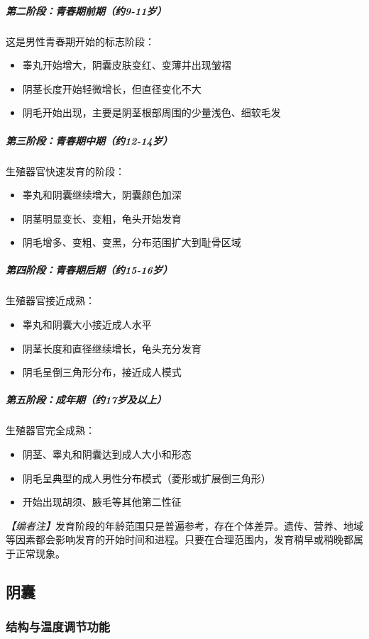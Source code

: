 \subparagraph{第二阶段：青春期前期（约9-11岁）}

这是男性青春期开始的标志阶段：
\begin{itemize}
    \item 睾丸开始增大，阴囊皮肤变红、变薄并出现皱褶
    \item 阴茎长度开始轻微增长，但直径变化不大
    \item 阴毛开始出现，主要是阴茎根部周围的少量浅色、细软毛发
\end{itemize}

\subparagraph{第三阶段：青春期中期（约12-14岁）}

生殖器官快速发育的阶段：
\begin{itemize}
    \item 睾丸和阴囊继续增大，阴囊颜色加深
    \item 阴茎明显变长、变粗，龟头开始发育
    \item 阴毛增多、变粗、变黑，分布范围扩大到耻骨区域
\end{itemize}

\subparagraph{第四阶段：青春期后期（约15-16岁）}

生殖器官接近成熟：
\begin{itemize}
    \item 睾丸和阴囊大小接近成人水平
    \item 阴茎长度和直径继续增长，龟头充分发育
    \item 阴毛呈倒三角形分布，接近成人模式
\end{itemize}

\subparagraph{第五阶段：成年期（约17岁及以上）}

生殖器官完全成熟：
\begin{itemize}
    \item 阴茎、睾丸和阴囊达到成人大小和形态
    \item 阴毛呈典型的成人男性分布模式（菱形或扩展倒三角形）
    \item 开始出现胡须、腋毛等其他第二性征
\end{itemize}

\noindent\textit{【编者注】}发育阶段的年龄范围只是普遍参考，存在个体差异。遗传、营养、地域等因素都会影响发育的开始时间和进程。只要在合理范围内，发育稍早或稍晚都属于正常现象。

\subsection{阴囊}
\subsubsection{结构与温度调节功能}

